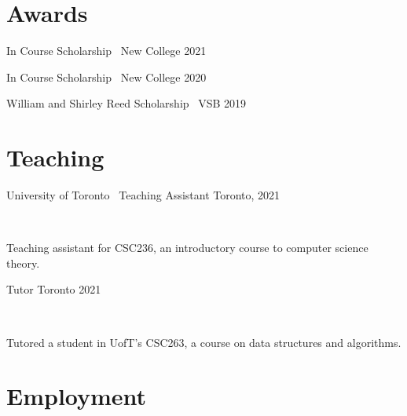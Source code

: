 \documentclass[]{style}
\begin{document}
\section{Awards}

\begin{entrylist}

\vspace{-3mm}

\entry
{In Course Scholarship \ {\normalfont New College}}
{2021}
{}

\vspace{-3mm}

\entry
{In Course Scholarship \ {\normalfont New College}}
{2020}
{}

\vspace{-3mm}

\entry
{William and Shirley Reed Scholarship \ {\normalfont VSB}}
{2019}
{}

\end{entrylist}

\section{Teaching}

\begin{entrylist}

\vspace{1mm}

\entry
{University of Toronto \ {\normalfont Teaching Assistant}}
{Toronto, 2021}
{ ~ \vspace{-2.5mm}

Teaching assistant for CSC236, an introductory course to computer science theory.  
}

\entry
{Tutor}
{Toronto 2021}
{ ~ \vspace{-2.5mm}

Tutored a student in UofT's CSC263, a course on data structures and algorithms.}

\end{entrylist}

\section{Employment}
\end{document}
